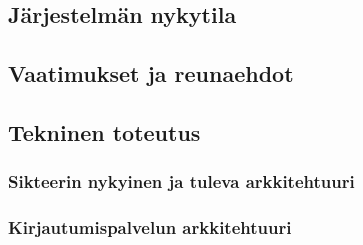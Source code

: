 
\subsection{Järjestelmän nykytila}

\subsection{Vaatimukset ja reunaehdot}

\subsection{Tekninen toteutus}

\subsubsection{Sikteerin nykyinen ja tuleva arkkitehtuuri}

\subsubsection{Kirjautumispalvelun arkkitehtuuri}
